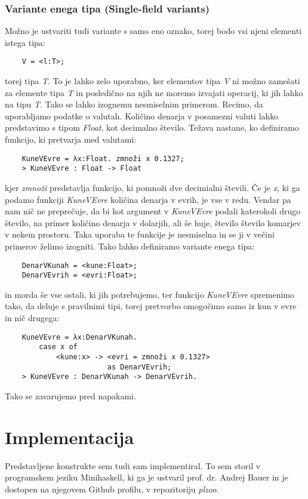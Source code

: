 \documentclass[a4paper]{report}
\begin{document}
\subsubsection{Variante enega tipa (Single-field variants)}
Možno je ustvariti tudi variante s samo eno oznako, torej bodo vsi njeni elementi istega tipa:
\begin{lstlisting}
    V = <l:T>;
\end{lstlisting}
torej tipa \emph{T}. To je lahko zelo uporabno, ker elementov tipa \emph{V} ni možno zamešati za elemente tipa \emph{T} in posledično na njih ne moremo izvajati operacij, ki jih lahko na tipu 
\emph{T}. Tako se lahko izognemu nesmiselnim primerom. Recimo, da uporabljamo podatke o valutah. Količino denarja v posamezni valuti lahko predstavimo s tipom \emph{Float}, kot decimalno 
število. Težava nastane, ko definiramo funkcijo, ki pretvarja med valutami:
\begin{lstlisting}
    KuneVEvre = λx:Float. zmnoži x 0.1327;
    > KuneVEvre : Float -> Float
\end{lstlisting}
kjer \emph{zmnoži} predstavlja funkcijo, ki pomnoži dve decimialni števili. Če je \emph{x}, ki ga podamo funkciji \emph{KuneVEvre} količina denarja v evrih, je vse v redu. Vendar pa nam nič ne 
preprečuje, da bi kot argument v \emph{KuneVEvre} podali katerokoli drugo število, na primer količino denarja v dolarjih, ali še huje, število število komarjev v nekem prostoru. Taka uporaba te 
funkcije je nesmiselna in se ji v večini primerov želimo izogniti. Tako lahko definiramo variante enega tipa:
\begin{lstlisting}
    DenarVKunah = <kune:Float>;
    DenarVEvrih = <evri:Float>;
\end{lstlisting}
in morda še vse ostali, ki jih potrebujemo, ter funkcijo \emph{KuneVEvre} spremenimo tako, da deluje s pravilnimi tipi, torej pretvorbo omogočimo 
samo iz kun v evre in nič drugega:
\begin{lstlisting}
    KuneVEvre = λx:DenarVKunah.
        case x of 
            <kune:x> -> <evri = zmnoži x 0.1327> 
                        as DenarVEvrih;
    > KuneVEvre : DenarVKunah -> DenarVEvrih.
\end{lstlisting}
Tako se zavarujemo pred napakami.
\newpage

\section{Implementacija}
Predstavljene konstrukte sem tudi sam implementiral. To sem storil v programskem jeziku Minihaskell, ki ga je ustvaril prof. dr. Andrej Bauer in 
je dostopen na njegovem Github profilu, v repozitoriju \emph{plzoo}. 
\end{document}
